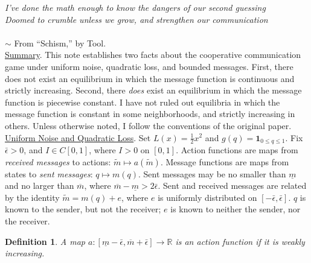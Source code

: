 \documentclass[12pt]{article}
\newtheorem{definition}{Definition}
\begin{document}
\noindent\textit{I've done the math enough to know the dangers of our second guessing\\ Doomed to crumble unless we grow, and strengthen our communication}\\ \\$\sim$ From ``Schism,'' by Tool. \\

\noindent\underline{Summary}. This note establishes two facts about the cooperative communication game under uniform noise, quadratic loss, and bounded messages. First, there does not exist an equilibrium in which the message function is continuous and strictly increasing. Second, there \textit{does} exist an equilibrium in which the message function is piecewise constant. I have not ruled out equilibria in which the message function is constant in some neighborhoods, and strictly increasing in others. Unless otherwise noted, I follow the conventions of the original paper.\\

\noindent\underline{Uniform Noise and Quadratic Loss}. Set $L(x)=\tfrac{1}{2}x^2$ and $g(q)=\mathbf{1}_{0\leq q\leq1}$. Fix $\bar{\epsilon}>0$, and $I\in C[0,1]$, where $I>0$ on $[0,1]$. Action functions are maps from \textit{received messages} to actions: $\tilde{m}\mapsto a(\tilde{m})$. Message functions are maps from states to \textit{sent messages}: $q\mapsto m(q)$. Sent messages may be no smaller than $\underline{m}$ and no larger than $\overline{m}$, where $\overline{m}-\underline{m}>2\bar{\epsilon}$. Sent and received messages are related by the identity $\tilde{m}=m(q)+e$, where $e$ is uniformly distributed on $[-\bar{\epsilon},\bar{\epsilon}]$. $q$ is known to the sender, but not the receiver; $e$ is known to neither the sender, nor the receiver. 

\begin{definition}
A map $a:[\underline{m}-\bar{\epsilon},\overline{m}+\bar{\epsilon}]\rightarrow\mathbb{R}$ is an action function if it is weakly increasing.  
\end{definition}
\end{document}
